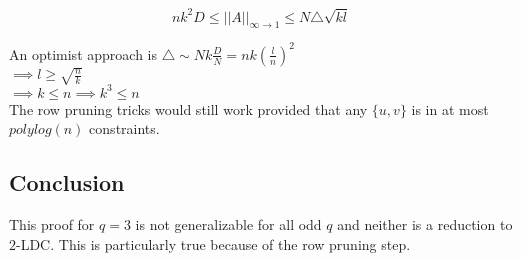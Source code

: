 \documentclass{article}
\begin{document}
\begin{equation*}
nk^2D \leq ||A||_{\infty \to 1} \leq N \triangle \sqrt{kl}
\end{equation*}

\noindent An optimist approach is $\triangle \sim Nk\frac{D}{N} = nk(\frac{l}{n})^2$\\

\noindent $\implies l \geq \sqrt{\frac{n}{k}}$\\

\noindent $\implies k \leq n \implies k^3 \leq n$\\

\noindent The row pruning tricks would still work provided that any $\{u, v\}$ is in at most $polylog(n)$ constraints.

\subsection{Conclusion}

This proof for $q=3$ is not generalizable for all odd $q$ and neither is a reduction to $2$-LDC. This is particularly true because of the row pruning step.

\newpage

\end{document}
